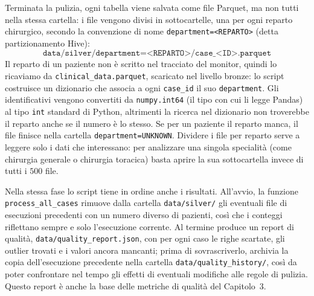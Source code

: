 Terminata la pulizia, ogni tabella viene salvata come file Parquet, ma non tutti nella stessa cartella: i file vengono divisi in sottocartelle, una per ogni reparto chirurgico, secondo la convenzione di nome \texttt{department=<REPARTO>} (detta partizionamento Hive):
$$\texttt{data/silver/department=<REPARTO>/case\_<ID>.parquet}$$
Il reparto di un paziente non \`e scritto nel tracciato del monitor, quindi lo ricaviamo da \texttt{clinical\_\allowbreak data.\allowbreak parquet}, scaricato nel livello bronze: lo script costruisce un dizionario che associa a ogni \texttt{case\_id} il suo \texttt{department}. Gli identificativi vengono convertiti da \texttt{numpy.int64} (il tipo con cui li legge Pandas) al tipo \texttt{int} standard di Python, altrimenti la ricerca nel dizionario non troverebbe il reparto anche se il numero \`e lo stesso. Se per un paziente il reparto manca, il file finisce nella cartella \texttt{department=UNKNOWN}. Dividere i file per reparto serve a leggere solo i dati che interessano: per analizzare una singola specialit\`a (come chirurgia generale o chirurgia toracica) basta aprire la sua sottocartella invece di tutti i $500$ file.

Nella stessa fase lo script tiene in ordine anche i risultati. All'avvio, la funzione \texttt{process\_\allowbreak all\_cases} rimuove dalla cartella \texttt{data/silver/} gli eventuali file di esecuzioni precedenti con un numero diverso di pazienti, cos\`i che i conteggi riflettano sempre e solo l'esecuzione corrente. Al termine produce un report di qualit\`a, \texttt{data/\allowbreak quality\_\allowbreak report.json}, con per ogni caso le righe scartate, gli outlier trovati e i valori ancora mancanti; prima di sovrascriverlo, archivia la copia dell'esecuzione precedente nella cartella \texttt{data/\allowbreak quality\_\allowbreak history/}, cos\`i da poter confrontare nel tempo gli effetti di eventuali modifiche alle regole di pulizia. Questo report \`e anche la base delle metriche di qualit\`a del Capitolo~3.

